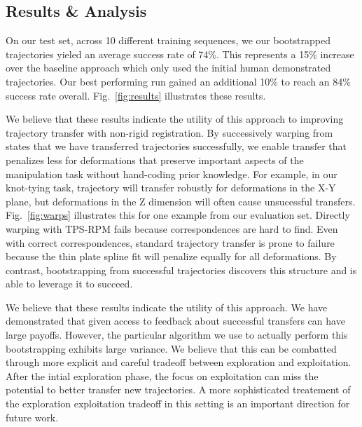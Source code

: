 \subsection{Results & Analysis}

On our test set, across 10 different training sequences, we our bootstrapped trajectories
yieled an average success rate of 74\%. This represents a 15\% increase over the baseline 
approach which only used the initial human demonstrated trajectories. Our best performing
run gained an additional 10\% to reach an 84\% success rate overall. Fig.~\ref{fig:results} 
illustrates these results.

We believe that these results indicate the utility of this approach to improving
trajectory transfer with non-rigid registration. By successively warping from 
states that we have transferred trajectories successfully, we enable transfer
that penalizes less for deformations that preserve important aspects of the manipulation
task without hand-coding prior knowledge. For example, in our knot-tying task, trajectory 
will transfer robustly for deformations in the X-Y plane, but deformations in the Z dimension
will often cause unsucessful transfers. Fig.~\ref{fig:warps} illustrates this for one
example from our evaluation set. Directly warping with TPS-RPM fails because correspondences 
are hard to find. Even with correct correspondences, standard trajectory transfer is
prone to failure because the thin plate spline fit will penalize equally for all deformations.
By contrast, bootstrapping from successful trajectories discovers this structure
and is able to leverage it to succeed. 

We believe that these results indicate the utility of this approach. We have demonstrated that
given access to feedback about successful transfers can have large payoffs. However,
the particular algorithm we use to actually perform this bootstrapping exhibits large variance.
We believe that this can be combatted through more explicit and careful tradeoff between
exploration and exploitation. After the intial exploration phase, the focus on exploitation
can miss the potential to better transfer new trajectories. A more sophisticated treatement
of the exploration exploitation tradeoff in this setting is an important direction for future work.

